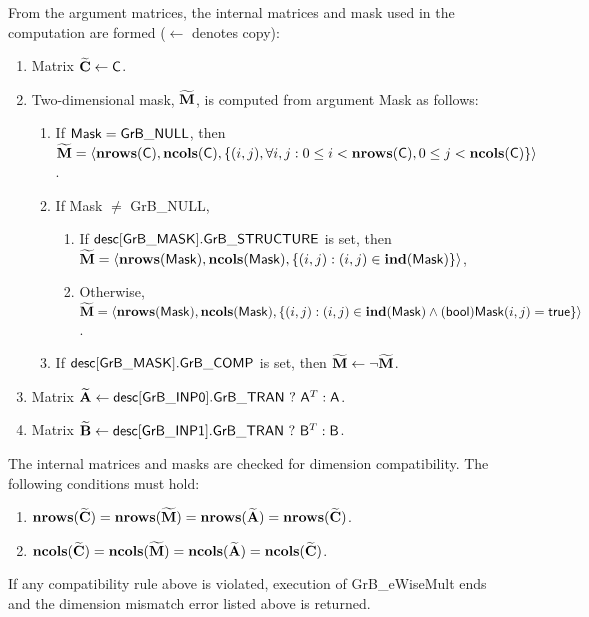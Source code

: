 From the argument matrices, the internal matrices and mask used in 
the computation are formed ($\leftarrow$ denotes copy):
\begin{enumerate}
	\item Matrix ${\bf \widetilde{C}} \leftarrow {\sf C}$.

	\item Two-dimensional mask, ${\bf \widetilde{M}}$, is computed from
    argument {\sf Mask} as follows:
	\begin{enumerate}
		\item If ${\sf Mask} = {\sf GrB\_NULL}$, then ${\bf \widetilde{M}} = 
        \langle \bold{nrows}({\sf C}), \bold{ncols}({\sf C}), \{(i,j), 
        \forall i,j : 0 \leq i <  \bold{nrows}({\sf C}), 0 \leq j < 
        \bold{ncols}({\sf C}) \} \rangle$.

		\item If {\sf Mask} $\ne$ {\sf GrB\_NULL},
        \begin{enumerate}
            \item If ${\sf desc[GrB\_MASK].GrB\_STRUCTURE}$ is set, then 
            ${\bf \widetilde{M}} = \langle \bold{nrows}({\sf Mask}), 
            \bold{ncols}({\sf Mask}), \{(i,j) : (i,j) \in \bold{ind}({\sf Mask}) \} \rangle$,
            \item Otherwise, ${\bf \widetilde{M}} = \langle \bold{nrows}({\sf Mask}), 
            \bold{ncols}({\sf Mask}), \\ \{(i,j) : (i,j) \in \bold{ind}({\sf Mask}) \wedge 
            ({\sf bool}){\sf Mask}(i,j) = {\sf true}\} \rangle$.
        \end{enumerate}

		\item	If ${\sf desc[GrB\_MASK].GrB\_COMP}$ is set, then 
        ${\bf \widetilde{M}} \leftarrow \neg {\bf \widetilde{M}}$.
	\end{enumerate}

	\item Matrix ${\bf \widetilde{A}} \leftarrow
    {\sf desc[GrB\_INP0].GrB\_TRAN} \ ? \ {\sf A}^T : {\sf A}$.

	\item Matrix ${\bf \widetilde{B}} \leftarrow
    {\sf desc[GrB\_INP1].GrB\_TRAN} \ ? \ {\sf B}^T : {\sf B}$.
\end{enumerate}

The internal matrices and masks are checked for dimension compatibility. The following
conditions must hold:
\begin{enumerate}
	\item $\bold{nrows}({\bf \widetilde{C}}) = \bold{nrows}({\bf \widetilde{M}})
	     = \bold{nrows}({\bf \widetilde{A}}) = \bold{nrows}({\bf \widetilde{C}})$.

	\item $\bold{ncols}({\bf \widetilde{C}}) = \bold{ncols}({\bf \widetilde{M}})
	     = \bold{ncols}({\bf \widetilde{A}}) = \bold{ncols}({\bf \widetilde{C}})$.
\end{enumerate}
If any compatibility rule above is violated, execution of {\sf GrB\_eWiseMult} ends and
the dimension mismatch error listed above is returned.

